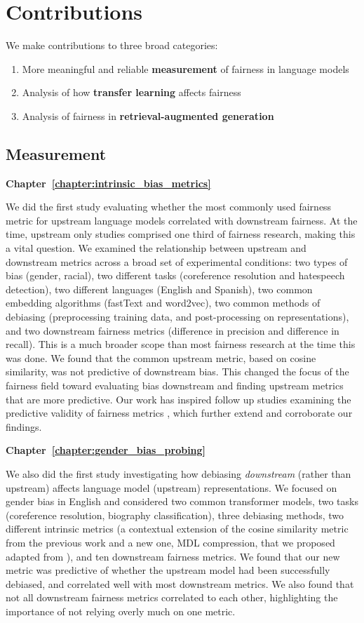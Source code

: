 \section{Contributions}
We make contributions to three broad categories: 
\begin{enumerate}
    \item More meaningful and reliable \textbf{measurement} of fairness in language models
    \item Analysis of how \textbf{transfer learning} affects fairness
    \item Analysis of fairness in \textbf{retrieval-augmented generation}    
\end{enumerate}

\subsection{Measurement} 
\textbf{Chapter~\ref{chapter:intrinsic_bias_metrics}}

We did the first study evaluating whether the most commonly used fairness metric for upstream language models correlated with downstream fairness. At the time, upstream only studies comprised one third of fairness research, making this a vital question. We examined the relationship between upstream and downstream metrics across a broad set of experimental conditions: two types of bias (gender, racial), two different tasks (coreference resolution and hatespeech detection), two different languages (English and Spanish), two common embedding algorithms (fastText and word2vec), two common methods of debiasing (preprocessing training data, and post-processing on representations), and two downstream fairness metrics (difference in precision and difference in recall). This is a much broader scope than most fairness research at the time this was done. We found that the common upstream metric, based on cosine similarity, was not predictive of downstream bias. This changed the focus of the fairness field toward evaluating bias downstream and finding upstream metrics that are more predictive. Our work has inspired follow up studies examining the predictive validity of fairness metrics \citep{cao-etal-2022-intrinsic, others?}, which further extend and corroborate our findings. 

\textbf{Chapter~\ref{chapter:gender_bias_probing}}

We also did the first study investigating how debiasing \textit{downstream} (rather than upstream) affects language model (upstream) representations. We focused on gender bias in English and considered two common transformer models, two tasks (coreference resolution, biography classification), three debiasing methods, two different intrinsic metrics (a contextual extension of the cosine similarity metric from the previous work and a new one, MDL compression, that we proposed adapted from \citet{voita-titov-2020-information}), and ten downstream fairness metrics. We found that our new metric was predictive of whether the upstream model had been successfully debiased, and correlated well with most downstream metrics. We also found that not all downstream fairness metrics correlated to each other, highlighting the importance of not relying overly much on one metric. 

